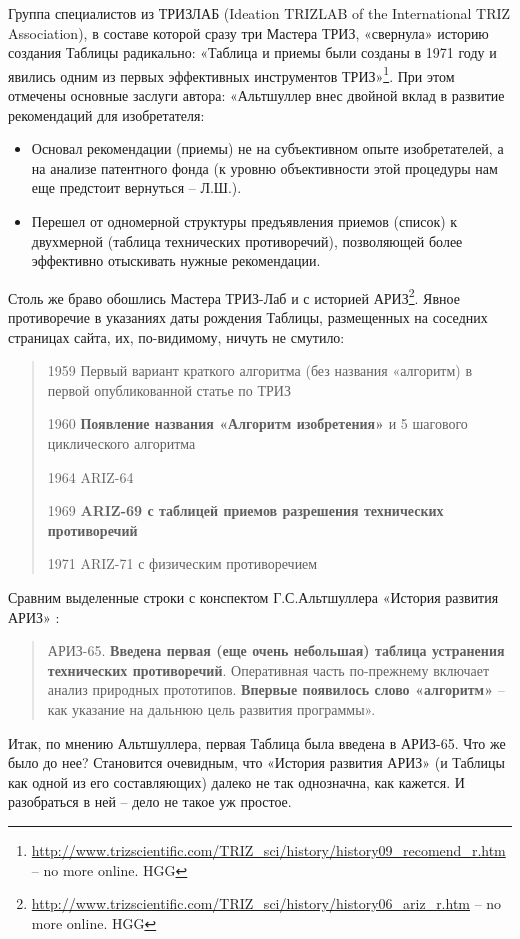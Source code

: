 \documentclass[11pt,a4paper]{article}
\begin{document}
Группа специалистов из ТРИЗЛАБ (Ideation TRIZLAB of the International TRIZ
Association), в составе которой сразу три Мастера ТРИЗ, «свернула» историю
создания Таблицы радикально: «Таблица и приемы были созданы в 1971 году и
явились одним из первых эффективных инструментов
ТРИЗ»\footnote{\url{http://www.trizscientific.com/TRIZ_sci/history/history09_recomend_r.htm}
  -- no more online. HGG}.  При этом отмечены основные заслуги автора:
«Альтшуллер внес двойной вклад в развитие рекомендаций для изобретателя:
\begin{itemize}
\item Основал рекомендации (приемы) не на субъективном опыте изобретателей, а
  на анализе патентного фонда (к уровню объективности этой процедуры нам еще
  предстоит вернуться -- Л.Ш.).
\item Перешел от одномерной структуры предъявления приемов (список) к
  двухмерной (таблица технических противоречий), позволяющей более эффективно
  отыскивать нужные рекомендации.
\end{itemize}
Столь же браво обошлись Мастера ТРИЗ-Лаб и с историей
АРИЗ\footnote{\url{http://www.trizscientific.com/TRIZ_sci/history/history06_ariz_r.htm}
  -- no more online. HGG}.  Явное противоречие в указаниях даты рождения
Таблицы, размещенных на соседних страницах сайта, их, по-видимому, ничуть не
смутило:
\begin{quote}  
  1959 Первый вариант краткого алгоритма (без названия «алгоритм) в первой
  опубликованной статье по ТРИЗ

  1960 \textbf{Появление названия «Алгоритм изобретения»} и 5 шагового
  циклического алгоритма

  1964 ARIZ-64

  1969 \textbf{ARIZ-69 с таблицей приемов разрешения технических противоречий} 

  1971 ARIZ-71 с физическим противоречием
\end{quote}
Сравним выделенные строки с конспектом Г.С.Альтшуллера «История развития
АРИЗ» \cite{Altshuller1986a}:
\begin{quote}  
  АРИЗ-65. \textbf{Введена первая (еще очень небольшая) таблица устранения
    технических противоречий}. Оперативная часть по-прежнему включает анализ
  природных прототипов. \textbf{Впервые появилось слово «алгоритм»} -- как
  указание на дальнюю цель развития программы».
\end{quote}
Итак, по мнению Альтшуллера, первая Таблица была введена в АРИЗ-65. Что же
было до нее? Становится очевидным, что «История развития АРИЗ» (и Таблицы как
одной из его составляющих) далеко не так однозначна, как кажется. И
разобраться в ней -- дело не такое уж простое.
\end{document}
